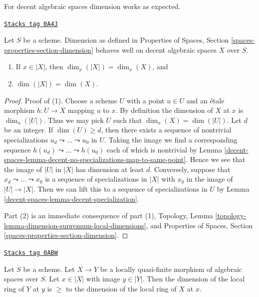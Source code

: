 For decent algebraic spaces dimension works as expected.

\begin{lemma}
\label{decent-spaces-lemma-dimension-decent-space}
\href{https://stacks.math.columbia.edu/tag/0A4J}{\texttt{Stacks tag 0A4J}}

Let $S$ be a scheme. Dimension as defined in
Properties of Spaces, Section \ref{spaces-properties-section-dimension}
behaves well on decent algebraic spaces $X$ over $S$.
\begin{enumerate}
\item If $x \in |X|$, then $\dim_x(|X|) = \dim_x(X)$, and
\item $\dim(|X|) = \dim(X)$.
\end{enumerate}
\end{lemma}

\begin{proof}
Proof of (1). Choose a scheme $U$ with a point $u \in U$
and an \'etale morphism $h : U \to X$ mapping $u$ to $x$.
By definition the dimension of $X$ at $x$ is $\dim_u(|U|)$.
Thus we may pick $U$ such that $\dim_x(X) = \dim(|U|)$.
Let $d$ be an integer. If $\dim(U) \geq d$, then
there exists a sequence of nontrivial specializations
$u_d \leadsto \ldots \leadsto u_0$ in $U$. Taking the image
we find a corresponding sequence
$h(u_d) \leadsto \ldots \leadsto h(u_0)$
each of which is nontrivial by
Lemma \ref{decent-spaces-lemma-decent-no-specializations-map-to-same-point}.
Hence we see that the image of $|U|$ in $|X|$ has dimension at least $d$.
Conversely, suppose that $x_d \leadsto \ldots \leadsto x_0$ is a
sequence of specializations in $|X|$ with $x_0$ in the image of
$|U| \to |X|$. Then we can lift this to a sequence of specializations
in $U$ by Lemma \ref{decent-spaces-lemma-decent-specialization}.

\medskip\noindent
Part (2) is an immediate consequence of part (1),
Topology, Lemma \ref{topology-lemma-dimension-supremum-local-dimensions},
and Properties of Spaces, Section \ref{spaces-properties-section-dimension}.
\end{proof}

\begin{lemma}
\label{decent-spaces-lemma-dimension-local-ring-quasi-finite}
\href{https://stacks.math.columbia.edu/tag/0ABW}{\texttt{Stacks tag 0ABW}}

Let $S$ be a scheme. Let $X \to Y$ be a locally quasi-finite morphism
of algebraic spaces over $S$. Let $x \in |X|$ with image $y \in |Y|$.
Then the dimension of the local ring of $Y$ at $y$ is $\geq$ to the
dimension of the local ring of $X$ at $x$.
\end{lemma}

